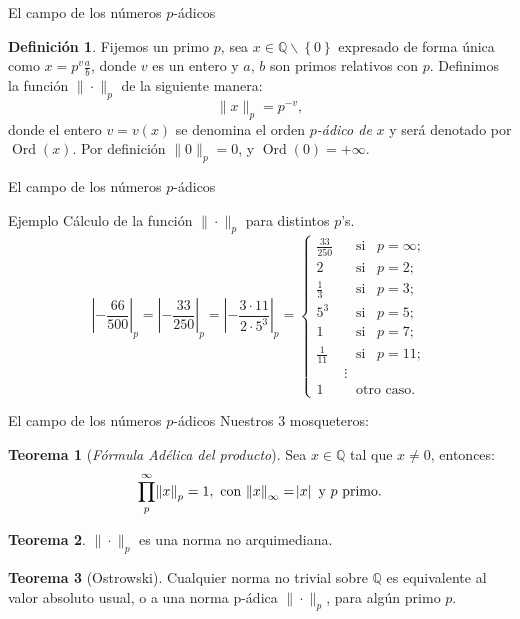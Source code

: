 \documentclass{beamer}
\newcommand{\bb}[1]{\mathbb{#1}}
\theoremstyle{definition}
\numberwithin{equation}{section}
\newcommand{\marine}[1]{\textcolor{defColor}{#1}}
\newcommand{\orangee}[1]{\textcolor{thColor}{#1}}
\newtheorem{df}{\marine{Definición}}
\newtheorem{thh}{\orangee{Teorema}}
\newcommand{\tit}[1]{\textit{#1}}
\newcommand{\pnorm}[1]{\|#1\|_p}
\DeclareMathOperator{\ord}{Ord}
\begin{document}
\begin{frame}{El campo de los números $p$-ádicos}
\begin{df} \label{ord_def_1}
	Fijemos un primo $p$, sea $x\in\mathbb{Q\smallsetminus}\left\{  0\right\}  $ expresado de forma única como $x=p^{v}\frac{a}{b}$, donde $v$ es un entero y
	$a$, $b$ son  primos relativos con $p$.
	Definimos la función $\pnorm{\cdot}$ de la siguiente manera:
	\[
	\| x\| _{p}=p^{-v},
	\]
	donde el entero $v=v\left (  x\right)  $ se denomina el orden $p$\textit{-ádico de} $x$ y
	será denotado por $\ord\left (  x\right)  $. Por definición $\|0\|_p=0$, y  $\ord (0)=+\infty $.
\end{df}
\end{frame}
\begin{frame}{El campo de los números $p$-ádicos}
	\begin{exampleblock}{Ejemplo}
		Cálculo de la función $\pnorm{\cdot}$ para distintos $p$'s.
		\[
		\left| -\frac{66}{500}\right| _{p}=\left| -\frac{33}{250}\right| _{p}=\left| -\frac{3\cdot11}{2\cdot5^3}\right| _{p}=\begin{cases}
		\frac{33}{250}       &\,\,\, \text{ si } \,\,\,p=\infty;\\ 
		2                    &\,\,\, \text{ si }\,\,\, p=2;\\
		\frac{1}{3}          &\,\,\, \text{ si } \,\,\,p=3;\\  
		5^3                  &\,\,\, \text{ si }\,\,\, p=5;\\   
		1                    &\,\,\, \text{ si }\,\,\, p=7;\\    
		\frac{1}{11}         & \,\,\,\text{ si }\,\,\, p=11;\\     
		& \vdots\\
		1                   &\,\,\,\text{ otro caso}.
		\end{cases}
		\]
	\end{exampleblock}
\end{frame}
\begin{frame}{El campo de los números $p$-ádicos}
	Nuestros 3 mosqueteros:
	\begin{thh}
		[\tit{Fórmula Adélica del producto}]
		Sea $x\in \bb{Q}$ tal que $x\neq0$, entonces:
		$$\displaystyle\prod_{p}^\infty \norm{x}_p=1, \text{ con } \norm{x}_\infty=\abs{x} \text{ y $p$ primo}.$$
	\end{thh}
\begin{thh}
		$\| \cdot \|_p$ es una norma no arquimediana.	
\end{thh}
\begin{thh}
	[Ostrowski]	\label{ostrowsky} Cualquier norma no trivial sobre $\mathbb{Q}$ es equivalente al
	valor absoluto usual, o a una norma p-ádica $\| \cdot\| _{p}%
	$, para algún primo $p$.
\end{thh}
\end{frame}
\end{document}
